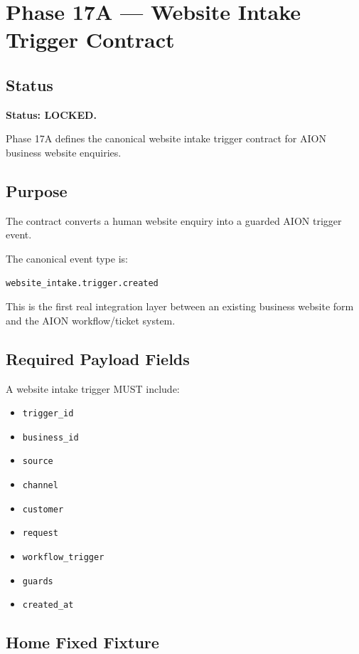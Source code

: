 \section{Phase 17A --- Website Intake Trigger Contract}
\label{sec:aion-phase17a-website-intake-trigger-contract}

\subsection{Status}

\textbf{Status: LOCKED.}

Phase 17A defines the canonical website intake trigger contract for AION business website enquiries.

\subsection{Purpose}

The contract converts a human website enquiry into a guarded AION trigger event.

The canonical event type is:

\begin{verbatim}
website_intake.trigger.created
\end{verbatim}

This is the first real integration layer between an existing business website form and the AION workflow/ticket system.

\subsection{Required Payload Fields}

A website intake trigger MUST include:

\begin{itemize}
  \item \texttt{trigger\_id}
  \item \texttt{business\_id}
  \item \texttt{source}
  \item \texttt{channel}
  \item \texttt{customer}
  \item \texttt{request}
  \item \texttt{workflow\_trigger}
  \item \texttt{guards}
  \item \texttt{created\_at}
\end{itemize}

\subsection{Home Fixed Fixture}

